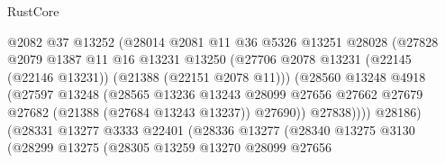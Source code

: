 \begin{lexlean}{RustCore}
\begin{coremodule}
                                    @2082
                                    @37
                                    @13252
                                    (@28014
                                      @2081
                                      @11
                                      @36
                                      @5326
                                      @13251
                                      @28028
                                      (@27828
                                        @2079
                                        @1387
                                        @11
                                        @16
                                        @13231
                                        @13250
                                        (@27706
                                          @2078
                                          @13231
                                          (@22145 (@22146 @13231))
                                          (@21388 (@22151 @2078 @11)))
                                        (@28560
                                          @13248
                                          @4918
                                          (@27597
                                            @13248
                                            (@28565
                                              @13236
                                              @13243
                                              @28099
                                              @27656
                                              @27662
                                              @27679
                                              @27682
                                              (@21388 (@27684 @13243 @13237))
                                              @27690))
                                          @27838))))
                                  @28186)
                                (@28331
                                  @13277
                                  @3333
                                  @22401
                                  (@28336
                                    @13277
                                    (@28340
                                      @13275
                                      @3130
                                      (@28299
                                        @13275
                                        (@28305
                                          @13259
                                          @13270
                                          @28099
                                          @27656

\end{coremodule}
\end{lexlean}
